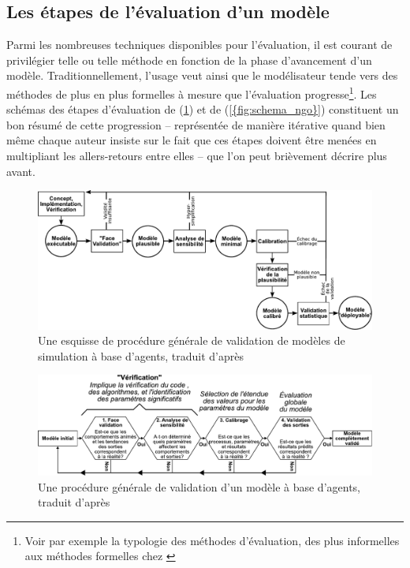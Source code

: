\clearpage

\subsection{Les étapes de l'évaluation d'un modèle}

Parmi les nombreuses techniques disponibles pour l'évaluation, il est courant de privilégier telle ou telle méthode en fonction de la phase d'avancement d'un modèle.
Traditionnellement, l'usage veut ainsi que le modélisateur tende vers des méthodes de plus en plus formelles à mesure que l'évaluation progresse\footnote{
	Voir par exemple la typologie des méthodes d'évaluation, des plus \og informelles \fg{} aux méthodes \og formelles \fg{} chez \textcite[figure 3, p. 131]{balci_validation_1994}}.
Les schémas des étapes d'évaluation de \citeauthor{klugl_validation_2008} (\cref{fig:schema_kluegl}) et de \citeauthor{ngo_calibration_2012} (\cref{{fig:schema_ngo}}) constituent un bon résumé de cette progression -- représentée de manière itérative quand bien même chaque auteur insiste sur le fait que ces étapes doivent être menées en multipliant les allers-retours entre elles -- que l'on peut brièvement décrire plus avant.

\begin{figure}[H]
	\center
	\includegraphics[width=\linewidth]{img/schema_kluegl_traduit.pdf}
	\caption[Une esquisse de procédure générale de validation de modèles de simulation à base d'agents.]{Une esquisse de procédure générale de validation de modèles de simulation à base d'agents, traduit d'après \textcite[fig. 1 p. 42]{klugl_validation_2008}}
	\label{fig:schema_kluegl}
\end{figure}
\bigskip
\begin{figure}[H]
	\center
	\includegraphics[width=\linewidth]{img/schema_ngo.pdf}
	\caption[Procédure générale de validation d'un modèle à base d'agents.]{Une procédure générale de validation d'un modèle à base d'agents, traduit d'après \textcite[fig. 10.1 p. 183]{ngo_calibration_2012}}
	\label{fig:schema_ngo}
\end{figure}


